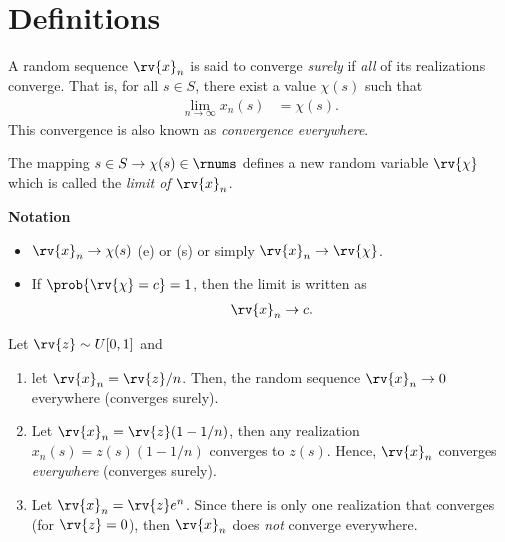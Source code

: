 \section{Definitions}
\begin{definitionBox}
    A random sequence $\rv{x}_{n}$ is said to converge \emph{surely} if \emph{all} of its realizations converge. That is, for all $s\in S$, there exist a value $\chi(s)$ such that
    \begin{align}
        \lim_{n\to\infty} x_{n}(s) &= \chi(s).
    \end{align}
    This convergence is also known as \emph{convergence everywhere}.
\end{definitionBox}
\begin{remarkBox}
    The mapping $s\in S\to\chi(s)\in\rnums$ defines a new random variable $\rv{\chi}$ which is called the \emph{limit of $\rv{x}_{n}$}.

    \textbf{Notation}
    \begin{itemize}
        \item $\rv{x}_{n}\to\chi(s)$ (e) or (s) or simply $\rv{x}_{n}\to\rv{\chi}$.
        \item If $\prob{\rv{\chi} = c}=1$, then the limit is written as
        \begin{align}
            \rv{x}_{n}\to c.
        \end{align}
    \end{itemize}
\end{remarkBox}

\begin{example}
    \label{example:surely convergent sequences}
    Let $\rv{z}\sim U[0,1]$ and 
    \begin{enumerate}
        \item let $\rv{x}_{n} = \rv{z}/n$. Then, the random sequence $\rv{x}_{n}\to 0$ everywhere (converges surely).
        \item Let $\rv{x}_{n} = \rv{z}(1-1/n)$, then any realization $x_{n}(s)=z(s)(1-1/n)$ converges to $z(s)$. Hence, $\rv{x}_{n}$ converges \emph{everywhere} (converges surely).
        \item Let $\rv{x}_{n} = \rv{z}e^{n}$. Since there is only one realization that converges (for $\rv{z}=0$), then $\rv{x}_{n}$ does \emph{not} converge everywhere.
    \end{enumerate}
\end{example}

